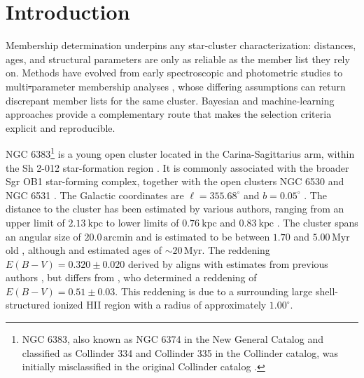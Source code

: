 \documentclass{aa}
\providecommand{\DIFdeltex}[1]{{\protect\color{red}\sout{#1}}} %
\providecommand{\DIFdelbegin}{} %
\providecommand{\DIFdelend}{} %
\providecommand{\DIFdel}[1]{\texorpdfstring{\DIFdeltex{#1}}{}} %
\providecommand{\DIFscaledelfig}{0.5}
\newlength{\DIFdelgraphicswidth} %
\newlength{\DIFdelgraphicsheight} %
\providecommand{\DIFdelincludegraphics}[2][]{%
\sbox{\DIFdelgraphicsbox}{\DIFOincludegraphics[#1]{#2}}%
\settoboxwidth{\DIFdelgraphicswidth}{\DIFdelgraphicsbox} %
\settoboxtotalheight{\DIFdelgraphicsheight}{\DIFdelgraphicsbox} %
\scalebox{\DIFscaledelfig}{%
\parbox[b]{\DIFdelgraphicswidth}{\usebox{\DIFdelgraphicsbox}\\[-\baselineskip] \rule{\DIFdelgraphicswidth}{0em}}\llap{\resizebox{\DIFdelgraphicswidth}{\DIFdelgraphicsheight}{%
\setlength{\unitlength}{\DIFdelgraphicswidth}%
\begin{picture}(1,1)%
\thicklines\linethickness{2pt} %
{\color[rgb]{1,0,0}\put(0,0){\framebox(1,1){}}}%
{\color[rgb]{1,0,0}\put(0,0){\line( 1,1){1}}}%
{\color[rgb]{1,0,0}\put(0,1){\line(1,-1){1}}}%
\end{picture}%
}\hspace*{3pt}}} %
} %
\DeclareRobustCommand{\DIFdelbegin}{\DIFOdelbegin \let\includegraphics\DIFdelincludegraphics} %
\DeclareRobustCommand{\DIFdelend}{\DIFOaddend \let\includegraphics\DIFOincludegraphics} %
\begin{document}


   \maketitle
\nolinenumbers

\section{Introduction}\label{S_intro}
Membership determination underpins any star-cluster characterization: distances, ages, and structural parameters are only as reliable as the member list they rely on. Methods have evolved from early spectroscopic and photometric studies \citep[e.g.,][]{1930LicOB..14..154T,1949ApJ...110..117S,1968ArA.....5....1L,1978MNRAS.182..607F} to multi\DIFdelbegin \DIFdel{-}\DIFdelend parameter membership analyses \citep{1989MNRAS.236..263P,1991MNRAS.249...76B,2005AA...438.1163K,2007AA...462..157P,2018AA...610A..30A}, whose differing assumptions can return discrepant member lists for the same cluster. Bayesian and machine-learning approaches provide a complementary route that makes the selection criteria explicit and reproducible.

NGC 6383\footnote{NGC 6383, also known as NGC 6374 in the New General Catalog \citep{2008hsf2.book..497R} and classified as Collinder 334 and Collinder 335 in the Collinder catalog, was initially misclassified in the original Collinder catalog \citep{1931AnLun...2....1C}.} is a young open cluster located in the Carina-Sagittarius arm, within the Sh 2-012 star-formation region \citep{1959ApJS....4..257S}. It is commonly associated with the broader Sgr OB1 star-forming complex, together with the open clusters NGC 6530 and NGC 6531 \citep{2008hsf2.book..497R}. The Galactic coordinates are $\ell = 355.68^{\circ}$ and $b = 0.05^{\circ}$ \citep{2017A&A...600A.106C}. The distance to the cluster has been estimated by various authors, ranging from an upper limit of $2.13~\mathrm{kpc}$ \citep{1930LicOB..14..154T} to lower limits of $0.76~\mathrm{kpc}$ \citep{1949ApJ...110..117S} and $0.83~\mathrm{kpc}$ \citep{2018AA...610A..30A}. The cluster spans an angular size of $20.0\,\mathrm{arcmin}$ \citep{2013A&A...560A..76M} and is estimated to be between $1.70$ and $5.00\,\mathrm{Myr}$ old \citep{1978MNRAS.182..607F,1989MNRAS.236..263P,2005AA...438.1163K,2007AA...462..157P}, although \citet{1968ArA.....5....1L} and \citet{1991MNRAS.249...76B} estimated ages of $\sim20\,\mathrm{Myr}$. The reddening $E(B-V) = 0.320 \pm 0.020$ derived by \citet{2008hsf2.book..497R} aligns with estimates from previous authors \citep{1971AAS....4..241B,1978MNRAS.182..607F,1978MNRAS.184..661L,1985AA...151..391T,1989MNRAS.236..263P,1994RMxAA..29..141F,2007AA...462..157P}, but differs from \citet{2018AA...610A..30A}, who determined a reddening of $E(B-V) = 0.51 \pm 0.03$. This reddening is due to a surrounding large shell-structured ionized HII region with a radius of approximately $1.00^{\circ}$.
\end{document}
